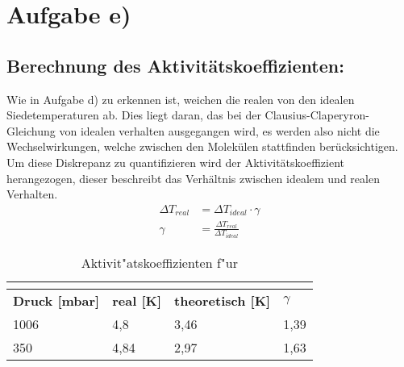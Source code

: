 \section{Aufgabe e)}
\subsection{Berechnung des Aktivitätskoeffizienten:}
Wie in Aufgabe d) zu erkennen ist, weichen die realen von den idealen
Siedetemperaturen ab. Dies liegt daran, das bei der Clausius-Claperyron-Gleichung von idealen verhalten
ausgegangen wird, es werden also nicht die Wechselwirkungen, welche zwischen den Molekülen stattfinden berücksichtigen.
Um diese Diskrepanz zu quantifizieren wird der Aktivitätskoeffizient herangezogen, dieser beschreibt das Verhältnis
zwischen idealem und realen Verhalten.
\begin{align*}
	\Delta T_{real} & = \Delta T_{ideal} \cdot \gamma            \\
	\gamma          & = \frac{\Delta T_{real}}{\Delta T_{ideal}}
\end{align*}


\newline

\begin{table}[H]
	\centering
	\label{tab: Aktivitätskoeffizient_NaCl}
	\begin{tabular}{|l|l|l|l|}
		\hline
		\multicolumn{4}{|c|}{\textbf{\ce{NaCl}}}                                                 \\\hline
		\textbf{Druck [mbar]} & \textbf{real [K]} & \textbf{theoretisch [K]} & \textbf{$\gamma$} \\\hline
		1006                  & 4,8               & 3,46                     & 1,39              \\
		350                   & 4,84              & 2,97                     & 1,63              \\\hline
	\end{tabular}
	\caption{Aktivit"atskoeffizienten f"ur }
\end{table}

